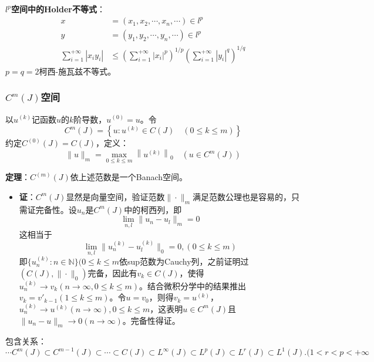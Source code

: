 \documentclass[12pt,a4paper]{article}
\begin{document}
\textbf{$l^p$空间中的Holder不等式}：
\begin{equation}
	\begin{aligned}
		x&=(x_1,x_2,\cdots,x_n,\cdots)\in l^p\\
		y&=(y_1,y_2,\cdots,y_n,\cdots)\in l^p\\
		\sum_{i=1}^{+\infty}|x_iy_i|&\leqslant \left(\sum_{i=1}^{+\infty}|x_i|^p\right)^{1/p}\left(\sum_{i=1}^{+\infty}|y_i|^q\right)^{1/q}
	\end{aligned}
\end{equation}
$p=q=2$柯西-施瓦兹不等式。
\subsubsection{$C^{m}(J)$空间}
以$u^{(k)}$记函数$u$的$k$阶导数，$u^{(0)}=u$。令
\begin{equation}
C^{m}(J)=\left\{u: u^{(k)} \in C(J) \quad(0 \leq k \leq m)\right\}
\end{equation}
约定$C^{(0)}(J)=C(J)$，定义：
\begin{equation}
\|u\|_{m}=\max _{0 \leq k \leq m}\left\|u^{(k)}\right\|_{0} \quad\left(u \in C^{m}(J)\right)
\end{equation}

\textbf{定理}：$C^{(m)}(J)$依上述范数是一个Banach空间。
\begin{itemize}
	\item []
	\textbf{证}：$C^m(J)$显然是向量空间，验证范数$\|\cdot\|_m$满足范数公理也是容易的，只需证完备性。设$u_n$是$C^m(J)$中的柯西列，即
	\begin{equation}
		\lim_{n,l}\|u_n-u_l\|_m=0
	\end{equation}
	这相当于
	\begin{equation}
		\lim_{n,l}\|u^{(k)}_n-u^{(k)}_l\|_0=0,(0\leqslant k\leqslant m)
	\end{equation}
	即$\{u_n^{(k)}:n\in \mathbb{N}\}(0\leqslant k\leqslant m$依sup范数为Cauchy列，之前证明过$(C(J),\|\cdot\|_0)$完备，因此有$v_k\in C(J)$，使得$u_n^{(k)}\rightarrow v_k(n\rightarrow \infty,0\leqslant k\leqslant m)$。结合微积分学中的结果推出$v_k=v'_{k-1}(1\leqslant k\leqslant m)$。令$u=v_0$，则得$v_k=u^{(k)}$，$u_n^{(k)}\rightarrow u^{(k)}(n\rightarrow \infty),0\leqslant k\leqslant m$，这表明$u\in C^m(J)$且$\|u_n-u\|_m\rightarrow 0(n\rightarrow \infty)$。完备性得证。
\end{itemize}
包含关系：$\cdots C^m(J)\subset C^{m-1}(J)\subset \cdots \subset C(J) \subset L^{\infty}(J)\subset L^p(J)\subset L^r(J)\subset L^1(J).(1<r<p<+\infty$
\end{document}

